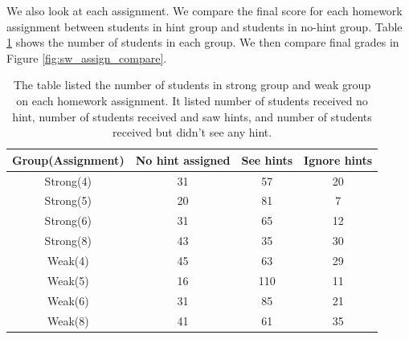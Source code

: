 \documentclass{article} %
\begin{document}
We also look at each assignment. We compare the final score for each homework assignment between students in hint group and students in no-hint group. Table \ref{tab:num_student_assign_pro} shows the number of students in each group. We then compare final grades in Figure \ref{fig:sw_assign_compare}.

\begin{table}[h]
\captionsetup{font=scriptsize}
\begin{center}
  \begin{tabular}{| c | c | c | c |}
  \hline
   Group(Assignment) & No hint assigned & See hints & Ignore hints \\ \hline
	Strong(4) & 31 & 57 & 20 \\
	Strong(5) & 20 & 81 & 7 \\
    Strong(6) & 31 & 65 & 12 \\
    Strong(8) & 43 & 35 & 30 \\ \hline
    Weak(4) & 45 & 63 & 29 \\
	Weak(5) & 16 & 110 & 11 \\
    Weak(6) & 31 & 85 & 21 \\
    Weak(8) & 41 & 61 & 35 \\ \hline
  \end{tabular}
  \caption{The table listed the number of students in strong group and weak group on each homework assignment. It listed number of students received no hint, number of students received and saw hints, and number of students received but didn't see any hint.}
  \label{tab:num_student_assign_pro}
  \end{center}
\end{table}
\end{document}
